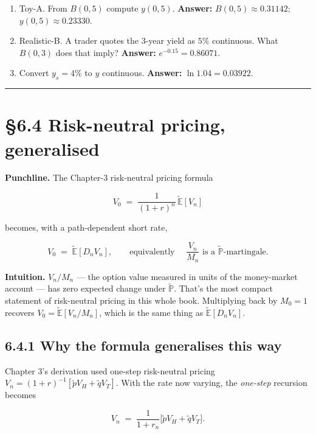 \documentclass[
  10pt,
  twoside]{book}
\providecommand{\tightlist}{%
  \setlength{\itemsep}{0pt}\setlength{\parskip}{0pt}}
\begin{document}
\begin{enumerate}
\def\labelenumi{\arabic{enumi}.}
\tightlist
\item
  Toy-A. From \(B(0, 5)\) compute \(y(0, 5)\). \textbf{Answer:}
  \(B(0, 5) \approx 0.31142\); \(y(0, 5) \approx 0.23330\).
\item
  Realistic-B. A trader quotes the 3-year yield as \(5\%\) continuous.
  What \(B(0, 3)\) does that imply? \textbf{Answer:}
  \(e^{-0.15} = 0.86071\).
\item
  Convert \(y_s = 4\%\) to \(y\) continuous. \textbf{Answer:}
  \(\ln 1.04 = 0.03922\).
\end{enumerate}

\begin{center}\rule{0.5\linewidth}{0.5pt}\end{center}

\section{§6.4 Risk-neutral pricing,
generalised}\label{risk-neutral-pricing-generalised}

\textbf{Punchline.} The Chapter-3 risk-neutral pricing formula

\[V_0 \;=\; \frac{1}{(1+r)^n}\, \tilde{\mathbb E}[V_n]\]

becomes, with a path-dependent short rate,

\[V_0 \;=\; \tilde{\mathbb E}[D_n V_n], \qquad \text{equivalently } \quad \frac{V_n}{M_n} \text{ is a } \tilde{\mathbb P}\text{-martingale.}\]

\textbf{Intuition.} \(V_n / M_n\) --- the option value measured in units
of the money-market account --- has zero expected change under
\(\tilde{\mathbb P}\). That's the most compact statement of risk-neutral
pricing in this whole book. Multiplying back by \(M_0 = 1\) recovers
\(V_0 = \tilde{\mathbb E}[V_n / M_n]\), which is the same thing as
\(\tilde{\mathbb E}[D_n V_n]\).

\subsection{6.4.1 Why the formula generalises this
way}\label{why-the-formula-generalises-this-way}

Chapter 3's derivation used one-step risk-neutral pricing
\(V_n = (1 + r)^{-1} [\tilde p V_H + \tilde q V_T]\). With the rate now
varying, the \emph{one-step} recursion becomes

\[V_n \;=\; \frac{1}{1 + r_n}\bigl[\tilde p V_H + \tilde q V_T\bigr].\]
\end{document}
